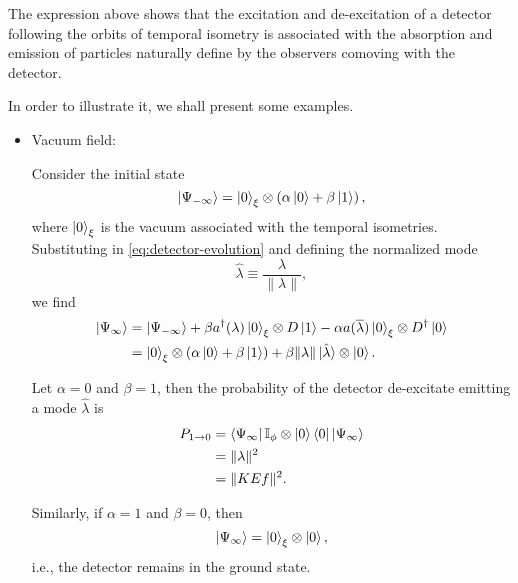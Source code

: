 The expression above shows that the excitation and de-excitation of a detector following the orbits of temporal isometry is associated with the absorption and emission of particles naturally define by the observers comoving with the detector.

In order to illustrate it, we shall present some examples.

\begin{itemize}
    \item Vacuum field:

    Consider the initial state
    \begin{equation}
        \ket{\Psi_{-\infty}}=\ket{0}_\xi\otimes\left(\alpha\ket{0}+\beta\ket{1}\right),
    \end{equation}
    where \(\ket{0}_\xi\) is the vacuum associated with the temporal isometries. Substituting in \cref{eq:detector-evolution} and defining the normalized mode
    \begin{equation}
        \hat{\lambda}\equiv\frac{\lambda}{\lVert\lambda\rVert},
    \end{equation}
    we find
    \begin{subequations}
        \begin{align}
            \ket{\Psi_\infty}&=\ket{\Psi_{-\infty}}+\beta a^{\dagger}(\lambda)\ket{0}_\xi\otimes D\ket{1}-\alpha a(\overline{\lambda})\ket{0}_\xi\otimes D^{\dagger}\ket{0}\\
            &=\ket{0}_\xi\otimes\left(\alpha\ket{0}+\beta\ket{1}\right)+\beta\lVert\lambda\rVert\ket{\hat{\lambda}}\otimes\ket{0}.
        \end{align}
    \end{subequations}

    Let \(\alpha=0\) and \(\beta=1\), then the probability of the detector de-excitate emitting a mode \(\hat{\lambda}\) is
    \begin{subequations}
        \begin{align}
            P_{1\to0}&=\bra{\Psi_{\infty}}{\mathbb{I}}_{\phi}\otimes\ket{0}\bra{0}\ket{\Psi_{\infty}}\\
            &=\lVert\lambda\rVert^2\\
            &=\lVert KEf\rVert^2.
        \end{align}
    \end{subequations}

    Similarly, if \(\alpha=1\) and \(\beta=0\), then
    \begin{equation}
        \ket{\Psi_\infty}=\ket{0}_\xi\otimes\ket{0},
    \end{equation}
    i.e., the detector remains in the ground state.


\end{itemize}
